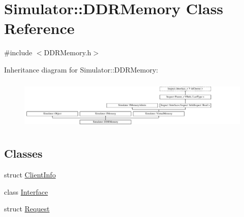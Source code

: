 \hypertarget{class_simulator_1_1_d_d_r_memory}{\section{Simulator\+:\+:D\+D\+R\+Memory Class Reference}
\label{class_simulator_1_1_d_d_r_memory}
}


{\ttfamily \#include $<$D\+D\+R\+Memory.\+h$>$}

Inheritance diagram for Simulator\+:\+:D\+D\+R\+Memory\+:\begin{figure}[H]
\begin{center}
\leavevmode
\includegraphics[height=2.456140cm]{class_simulator_1_1_d_d_r_memory}
\end{center}
\end{figure}
\subsection*{Classes}
\begin{DoxyCompactItemize}
\item 
struct \hyperlink{struct_simulator_1_1_d_d_r_memory_1_1_client_info}{Client\+Info}
\item 
class \hyperlink{class_simulator_1_1_d_d_r_memory_1_1_interface}{Interface}
\item 
struct \hyperlink{struct_simulator_1_1_d_d_r_memory_1_1_request}{Request}
\end{DoxyCompactItemize}
